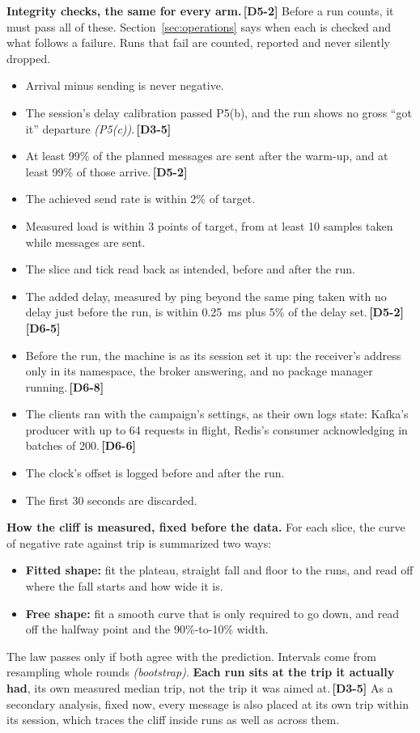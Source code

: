\documentclass[11pt]{article}
\newcommand{\gl}[1]{{\color{soft}\itshape\small (#1)}}
\newcommand{\chg}[1]{\,{\color{chgcol}\bfseries\footnotesize[#1]}}
\newcommand{\chgold}[1]{\,{\color{oldcol}\bfseries\footnotesize[#1]}}
\begin{document}
\textbf{Integrity checks, the same for every arm.}\chgold{D5-2} Before a run counts, it must pass all of these. Section~\ref{sec:operations} says when each is checked and what follows a failure. Runs that fail are counted, reported and never silently dropped.
\begin{itemize}
  \item Arrival minus sending is never negative.
  \item The session's delay calibration passed P5(b), and the run shows no gross ``got it'' departure \gl{P5(c)}.\chgold{D3-5}
  \item At least 99\% of the planned messages are sent after the warm-up, and at least 99\% of those arrive.\chgold{D5-2}
  \item The achieved send rate is within 2\% of target.
  \item Measured load is within 3 points of target, from at least 10 samples taken while messages are sent.
  \item The slice and tick read back as intended, before and after the run.
  \item The added delay, measured by ping beyond the same ping taken with no delay just before the run, is within 0.25~ms plus 5\% of the delay set.\chgold{D5-2}\chg{D6-5}
  \item Before the run, the machine is as its session set it up: the receiver's address only in its namespace, the broker answering, and no package manager running.\chg{D6-8}
  \item The clients ran with the campaign's settings, as their own logs state: Kafka's producer with up to 64 requests in flight, Redis's consumer acknowledging in batches of 200.\chg{D6-6}
  \item The clock's offset is logged before and after the run.
  \item The first 30 seconds are discarded.
\end{itemize}

\textbf{How the cliff is measured, fixed before the data.} For each slice, the curve of negative rate against trip is summarized two ways:
\begin{itemize}
  \item \textbf{Fitted shape:} fit the plateau, straight fall and floor to the runs, and read off where the fall starts and how wide it is.
  \item \textbf{Free shape:} fit a smooth curve that is only required to go down, and read off the halfway point and the 90\%-to-10\% width.
\end{itemize}
The law passes only if both agree with the prediction. Intervals come from resampling whole rounds \gl{bootstrap}. \textbf{Each run sits at the trip it actually had}, its own measured median trip, not the trip it was aimed at.\chgold{D3-5} As a secondary analysis, fixed now, every message is also placed at its own trip within its session, which traces the cliff inside runs as well as across them.
\end{document}
